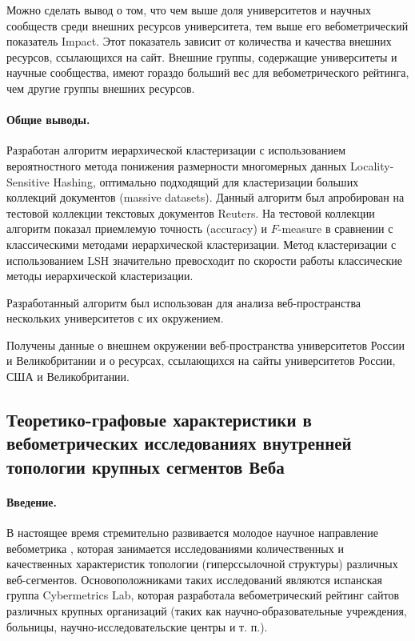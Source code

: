 Можно сделать вывод о том, что чем выше доля университетов и научных сообществ среди внешних ресурсов университета, тем выше его вебометрический показатель Impact. Этот показатель зависит от количества и качества внешних ресурсов, ссылающихся на сайт. Внешние группы, содержащие университеты и научные сообщества, имеют гораздо больший вес для вебометрического рейтинга, чем другие группы внешних ресурсов.

\paragraph{Общие выводы.} Разработан алгоритм иерархической кластеризации с использованием вероятностного метода понижения размерности многомерных данных Locality-Sensitive Hashing, оптимально подходящий для кластеризации больших коллекций документов (massive datasets). Данный алгоритм был апробирован на тестовой коллекции текстовых документов Reuters. На тестовой коллекции алгоритм показал приемлемую точность (accuracy) и \(F\)-measure в сравнении с классическими методами иерархической кластеризации. Метод кластеризации с использованием LSH значительно превосходит по скорости работы классические методы иерархической кластеризации.

Разработанный алгоритм был использован для анализа веб-пространства нескольких университетов с их окружением.

Получены данные о внешнем окружении веб-пространства университетов России и Великобритании и о ресурсах, ссылающихся на сайты университетов России, США и Великобритании.

\subsection{Теоретико-графовые характеристики в вебометрических исследованиях внутренней топологии крупных сегментов Веба}\label{subsec:ch1/sec4/sub7}

\paragraph{Введение.} В настоящее время стремительно развивается молодое научное направление вебометрика \cite{AlmindIngwersen,Thelwall,Pechnikov}, которая занимается исследованиями количественных и качественных характеристик топологии (гиперссылочной структуры) различных веб-сегментов. Основоположниками таких исследований являются испанская группа Cybermetrics Lab, которая разработала вебометрический рейтинг сайтов различных крупных организаций \cite{RankingWeb} (таких как научно-образовательные учреждения, больницы, научно-исследовательские центры и т. п.).  

